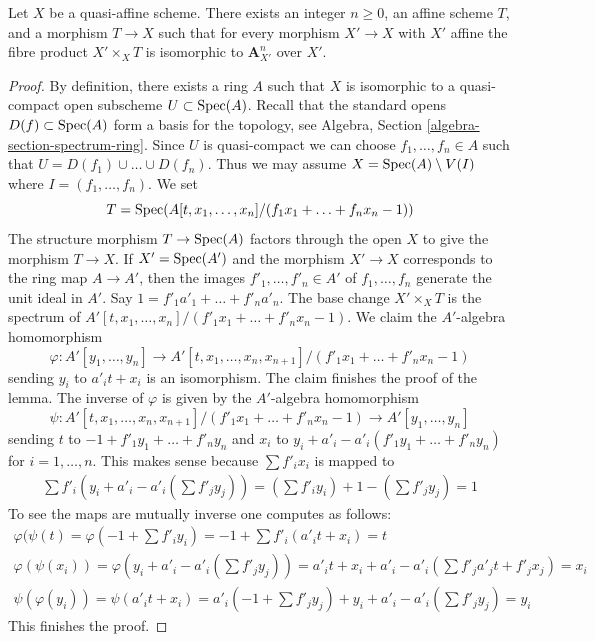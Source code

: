 \begin{lemma}
\label{lemma-quasi-affine-presentation}
Let $X$ be a quasi-affine scheme. There exists an integer $n \geq 0$,
an affine scheme $T$, and a morphism $T \to X$ such that for every
morphism $X' \to X$ with $X'$ affine the fibre product $X' \times_X T$
is isomorphic to $\mathbf{A}^n_{X'}$ over $X'$.
\end{lemma}

\begin{proof}
By definition, there exists a ring $A$ such that $X$ is isomorphic to a
quasi-compact open subscheme $U \subset \mathop{\mathrm{Spec}}(A)$. Recall that the standard
opens $D(f) \subset \mathop{\mathrm{Spec}}(A)$ form a basis for the topology, see
Algebra, Section \ref{algebra-section-spectrum-ring}. Since $U$ is
quasi-compact we can choose $f_1, \ldots, f_n \in A$ such that
$U = D(f_1) \cup \ldots \cup D(f_n)$. Thus we may assume
$X = \mathop{\mathrm{Spec}}(A) \setminus V(I)$ where $I = (f_1, \ldots, f_n)$. We set
$$
T = \mathop{\mathrm{Spec}}(A[t, x_1, \ldots, x_n]/(f_1 x_1 + \ldots + f_n x_n - 1))
$$
The structure morphism $T \to \mathop{\mathrm{Spec}}(A)$ factors through the open $X$
to give the morphism $T \to X$. If $X' = \mathop{\mathrm{Spec}}(A')$ and the morphism
$X' \to X$ corresponds to the ring map $A \to A'$, then the images
$f'_1, \ldots, f'_n \in A'$ of $f_1, \ldots, f_n$
generate the unit ideal in $A'$.
Say $1 = f'_1 a'_1 + \ldots + f'_n a'_n$.
The base change $X' \times_X T$ is the spectrum of
$A'[t, x_1, \ldots, x_n]/(f'_1 x_1 + \ldots + f'_n x_n - 1)$.
We claim the $A'$-algebra homomorphism
$$
\varphi :
A'[y_1, \ldots, y_n]
\longrightarrow
A'[t, x_1, \ldots, x_n, x_{n + 1}]/(f'_1 x_1 + \ldots + f'_n x_n - 1)
$$
sending $y_i$ to $a'_i t + x_i$ is an isomorphism. The claim finishes
the proof of the lemma. The inverse of $\varphi$ is given by the $A'$-algebra
homomorphism
$$
\psi :
A'[t, x_1, \ldots, x_n, x_{n + 1}]/(f'_1 x_1 + \ldots + f'_n x_n - 1)
\longrightarrow
A'[y_1, \ldots, y_n]
$$
sending $t$ to $-1 + f'_1 y_1 + \ldots + f'_n y_n$ and $x_i$ to
$y_i + a'_i - a'_i(f'_1 y_1 + \ldots + f'_n y_n)$ for $i = 1, \ldots, n$.
This makes sense because $\sum f'_ix_i$ is mapped to
$$
\begin{matrix}
\sum f'_i(y_i + a'_i - a'_i(\sum f'_j y_j)) =
(\sum f'_iy_i) + 1 - (\sum f'_j y_j) = 1
\end{matrix}
$$
To see the maps are mutually inverse one computes as follows:
$$
\begin{matrix}
\varphi(\psi(t) = \varphi(-1 +  \sum f'_i y_i) =
-1 + \sum f'_i (a'_i t + x_i) = t \\
\varphi(\psi(x_i)) = \varphi(y_i + a'_i - a'_i(\sum f'_j y_j)) =
a'_i t + x_i + a'_i - a'_i(\sum f'_ja'_jt + f'_jx_j) = x_i \\
\psi(\varphi(y_i)) = \psi(a'_i t + x_i) =
a'_i(-1 + \sum f'_j y_j) + y_i + a'_i - a'_i(\sum f'_j y_j) = y_i
\end{matrix}
$$
This finishes the proof.
\end{proof}




